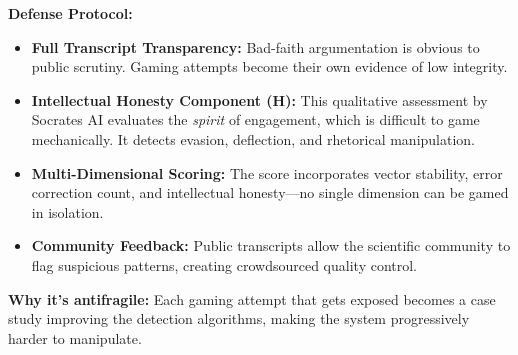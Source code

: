 \documentclass[11pt,a4paper]{article}
\begin{document}
\begin{small}
\textbf{Defense Protocol:}
\begin{itemize}[nosep]
    \item \textbf{Full Transcript Transparency:} Bad-faith argumentation is obvious to public scrutiny. Gaming attempts become their own evidence of low integrity.
    \item \textbf{Intellectual Honesty Component (H):} This qualitative assessment by Socrates AI evaluates the \textit{spirit} of engagement, which is difficult to game mechanically. It detects evasion, deflection, and rhetorical manipulation.
    \item \textbf{Multi-Dimensional Scoring:} The score incorporates vector stability, error correction count, and intellectual honesty—no single dimension can be gamed in isolation.
    \item \textbf{Community Feedback:} Public transcripts allow the scientific community to flag suspicious patterns, creating crowdsourced quality control.
\end{itemize}

\textbf{Why it's antifragile:} Each gaming attempt that gets exposed becomes a case study improving the detection algorithms, making the system progressively harder to manipulate.

\begin{figure}[h!]
\centering
{}
\end{figure}
\end{small}
\end{document}
